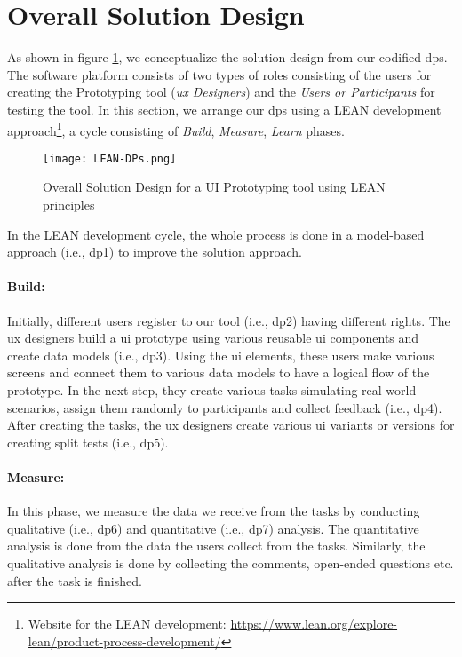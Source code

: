 \clearpage
\section{Overall Solution Design}
\label{design:section:solutiondesign}
As shown in figure \ref{fig:design:lean}, we conceptualize the solution design from our codified \ac{dp}s.
The software platform consists of two types of roles consisting of the users for creating the Prototyping tool (\textit{\ac{ux} Designers}) and the \textit{Users or Participants} for testing the tool.
In this section, we arrange our \ac{dp}s using a LEAN development approach\footnote{Website for the LEAN development: \url{https://www.lean.org/explore-lean/product-process-development/}}, a cycle consisting of \textit{Build}, \textit{Measure}, \textit{Learn} phases.

\begin{figure}[htbp!]
  \centering    
  \texttt{[image: LEAN-DPs.png]}
  \caption[Solution Concept]{Overall Solution Design for a UI Prototyping tool using LEAN principles\footnotemark[10]}
  \label{fig:design:lean}
\end{figure}

In the LEAN development cycle, the whole process is done in a model-based approach (i.e., \ac{dp}1) to improve the solution approach.
\paragraph{Build:}
\label{design:paragraph:build}
Initially, different users register to our tool (i.e., \ac{dp}2) having different rights. 
The \ac{ux} designers build a \ac{ui} prototype using various reusable \ac{ui} components and create data models (i.e., \ac{dp}3). 
Using the \ac{ui} elements, these users make various screens and connect them to various data models to have a logical flow of the prototype.
In the next step, they create various tasks simulating real-world scenarios, assign them randomly to participants and collect feedback (i.e., \ac{dp}4).
After creating the tasks, the \ac{ux} designers create various \ac{ui} variants or versions for creating split tests (i.e., \ac{dp}5).

\paragraph{Measure:}
\label{design:paragraph:measure}
In this phase, we measure the data we receive from the tasks by conducting qualitative (i.e., \ac{dp}6) and quantitative (i.e., \ac{dp}7) analysis.
The quantitative analysis is done from the data the users collect from the tasks.
Similarly, the qualitative analysis is done by collecting the comments, open-ended questions etc. after the task is finished. 
